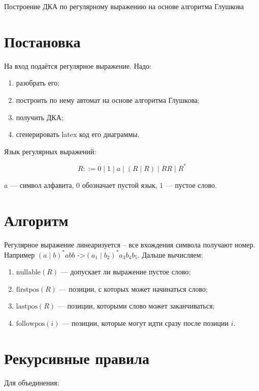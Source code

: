 \documentclass[a4paper,12pt]{article}
\begin{document}
\begin{center}
    {\Large Построение ДКА по регулярному выражению на основе алгоритма Глушкова}
\end{center}

\section*{Постановка}

На вход подаётся регулярное выражение. Надо:

\begin{enumerate}
    \item разобрать его;
    \item построить по нему автомат на основе алгоритма Глушкова;
    \item получить ДКА;
    \item сгенерировать latex код его диаграммы.
\end{enumerate}

Язык регулярных выражений:

\[
R ::= 0 \mid 1 \mid a \mid (R \mid R) \mid RR \mid R^*
\]

$a$ --- символ алфавита, $0$ обозначает пустой язык, $1$ --- пустое слово.

\section*{Алгоритм}

Регулярное выражение линеаризуется -- все вхождения символа получают номер.
Например $(a \mid b)^*abb$ ->$(a_1 \mid b_2)^* a_3 b_4 b_5.$
Дальше вычисляем:

\begin{enumerate}
    \item $\text{nullable}(R)$ --- допускает ли выражение пустое слово;
    \item $\text{firstpos}(R)$ --- позиции, с которых может начинаться слово;
    \item $\text{lastpos}(R)$ --- позиции, которыми слово может заканчиваться;
    \item $\text{followpos}(i)$ --- позиции, которые могут идти сразу после позиции $i$.
\end{enumerate}

\section*{Рекурсивные правила}

Для объединения:
\end{document}

